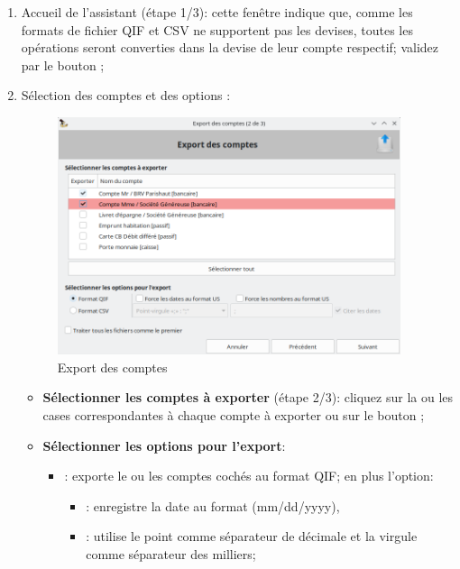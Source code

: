 \begin{enumerate}
	\item Accueil de l'assistant (étape 1/3): cette fenêtre indique que, comme les formats de fichier \gls{QIF} et \gls{CSV} ne supportent pas les devises, toutes les opérations seront converties dans la devise de leur compte respectif; validez par le bouton ;
	\item Sélection des comptes et des options :
		\begin{figure}[htbp]
			\begin{center}
				\includegraphics[width=0.95\textwidth]{image/screenshot/importexport_export}
			\end{center}
			\caption{Export des comptes}
			\label{importexport-export-img}
		\end{figure}
		\begin{itemize}
			\item \textbf{Sélectionner les comptes à exporter} (étape 2/3): cliquez sur la ou les cases correspondantes à chaque compte à exporter ou sur le bouton ;
			\item \textbf{Sélectionner les options pour l'export}:
			\begin{itemize}
					\item {}: exporte le ou les comptes cochés au format \gls{QIF}; en plus l'option:
						\begin{itemize}
							\item {}: enregistre la date au format  (mm/dd/yyyy),
							\item {}: utilise le point  comme séparateur de décimale et la virgule \frquote{,} comme séparateur des milliers;

\end{itemize}
\end{itemize}
\end{itemize}
\end{enumerate}
